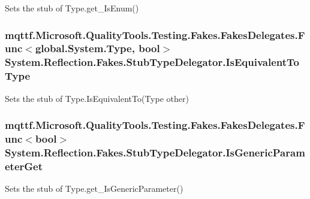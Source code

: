 Sets the stub of Type.\-get\-\_\-\-Is\-Enum()

\hypertarget{class_system_1_1_reflection_1_1_fakes_1_1_stub_type_delegator_a10eb112f22a3f56dcbab11d381303cf1}{
\subsubsection[{Is\-Equivalent\-To\-Type}]{\setlength{\rightskip}{0pt plus 5cm}mqttf.\-Microsoft.\-Quality\-Tools.\-Testing.\-Fakes.\-Fakes\-Delegates.\-Func$<$global.\-System.\-Type, bool$>$ System.\-Reflection.\-Fakes.\-Stub\-Type\-Delegator.\-Is\-Equivalent\-To\-Type}}\label{class_system_1_1_reflection_1_1_fakes_1_1_stub_type_delegator_a10eb112f22a3f56dcbab11d381303cf1}


Sets the stub of Type.\-Is\-Equivalent\-To(\-Type other)

\hypertarget{class_system_1_1_reflection_1_1_fakes_1_1_stub_type_delegator_a8319b92980167fd8688744d11d6fff7f}{
\subsubsection[{Is\-Generic\-Parameter\-Get}]{\setlength{\rightskip}{0pt plus 5cm}mqttf.\-Microsoft.\-Quality\-Tools.\-Testing.\-Fakes.\-Fakes\-Delegates.\-Func$<$bool$>$ System.\-Reflection.\-Fakes.\-Stub\-Type\-Delegator.\-Is\-Generic\-Parameter\-Get}}\label{class_system_1_1_reflection_1_1_fakes_1_1_stub_type_delegator_a8319b92980167fd8688744d11d6fff7f}


Sets the stub of Type.\-get\-\_\-\-Is\-Generic\-Parameter()

